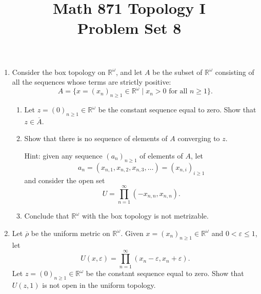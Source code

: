 \documentclass[12pt]{article}
\title{Math 871 Topology I \\ Problem Set 8}
\author{}
\date{}
\newcommand{\R}{\mathbb{R}}
\newcommand{\e}{\varepsilon}
\theoremstyle{definition}
\begin{document}
\maketitle


	
\thispagestyle{fancy}
\pagestyle{fancy}



\begin{enumerate}[roomy]

\item Consider the box topology on $\R^{\omega}$, and let $A$ be the subset of $\R^{\omega}$ consisting of all the sequences whose terms are strictly positive:
\[A = \{ x = (x_n)_{n \geqslant 1} \in \R^{\omega} \mid x_n > 0 \text{ for all } n \geqslant 1 \}.\]

\begin{enumerate}
\item Let $z = (0)_{n \geqslant 1} \in \R^{\omega}$ be the constant sequence equal to zero. Show that $z \in \overline{A}$.

\item Show that there is no sequence of elements of $A$ converging to $z$.

Hint: given any sequence $(a_n)_{n \geqslant 1}$ of elements of $A$, let
\[ a_n = (x_{n,1},x_{n,2},x_{n,3}, \ldots ) = (x_{n,i})_{i \geqslant 1}\]
and consider the open set
\[ U = \prod_{n =1}^\infty (-x_{n,n}, x_{n,n}).\]

\item Conclude that $\R^{\omega}$ with the box topology is not metrizable.
\end{enumerate}



\item Let $\overline{\rho}$ be the uniform metric on $\R^{\omega}$.
Given $x = (x_n)_{n \geqslant 1} \in \R^{\omega}$ and $0 < \e \leqslant 1$, let
\[ U(x, \e) = \prod_{n = 1}^\infty (x_n-\e, x_n + \e).\]
Let $z = (0)_{n \geqslant 1} \in \R^{\omega}$ be the constant sequence equal to zero. 
Show that $U(z,1)$ is not open in the uniform topology.

\end{enumerate}
\end{document}
